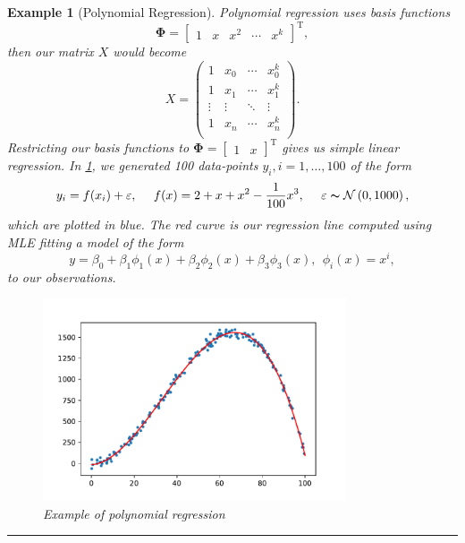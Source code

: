 \documentclass[10pt,a4paper]{article}
\numberwithin{equation}{section}
\theoremstyle{plain}
\theoremstyle{own}
\newtheorem{example}{Example}[section]
\begin{document}
\begin{example}[Polynomial Regression]
Polynomial regression uses basis functions
\begin{equation}
\boldsymbol\Phi = \left[ \begin{matrix} 1 & x & x^2 & \cdots & x^k  \end{matrix} \right]^{\text{T}},
\end{equation}
then our matrix $X$ would become
\begin{equation}
X = \left( \begin{matrix}
1 & x_0 & \cdots & x_0^k \\
1 & x_1 & \cdots & x_1^k \\
\vdots & \vdots & \ddots & \vdots \\
1 & x_n & \cdots & x_n^k \\
\end{matrix} \right).
\end{equation}
Restricting our basis functions to $\boldsymbol\Phi = [ \begin{matrix} 1 & x \end{matrix} ]^{\text{T}}$ gives us simple linear regression. In \cref{polybf}, we generated 100 data-points $y_i, i = 1, \ldots, 100$ of the form
\begin{equation}
y_i = f(x_i) + \varepsilon, ~~~~ f(x) = 2 + x + x^2 - \frac{1}{100} x^3, ~~~~ \varepsilon \thicksim \mathcal{N} \left( 0, 1000 \right),
\end{equation}
which are plotted in blue. The red curve is our regression line computed using MLE fitting a model of the form
\begin{equation}
y = \beta_0 + \beta_1 \phi_1(x) + \beta_2 \phi_2(x) + \beta_3 \phi_3(x), ~~ \phi_i(x) = x^i,
\end{equation}
to our observations.
\begin{figure}[H]
\centering
\includegraphics[width = 0.8\textwidth]{polyBF_example}
\caption{Example of polynomial regression}
\label{polybf}
\end{figure}
\hrule
\vspace{2mm}
\end{example}
\end{document}
